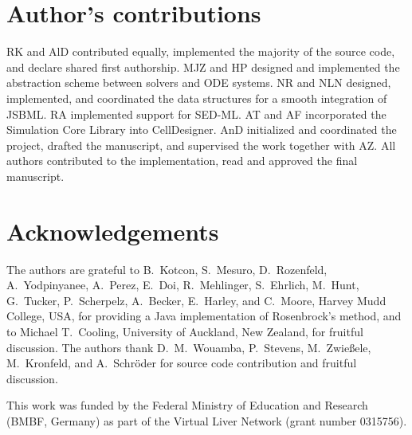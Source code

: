 \documentclass[10pt]{bmc_article}
\newenvironment{bmcformat}{\fussy\setboolean{publ}{true}}{\fussy}
\begin{document}
\begin{bmcformat}
\section*{Author's contributions}
RK and AlD contributed equally, implemented the majority of the source code, and declare shared first authorship.
MJZ and HP designed and implemented the abstraction scheme between solvers and ODE systems.
NR and NLN designed, implemented, and coordinated the data structures for a smooth integration of JSBML.
RA implemented support for \acs{SED-ML}. AT and AF incorporated the Simulation Core Library into CellDesigner.
AnD initialized and coordinated the project, drafted the manuscript, and supervised the work together with AZ.
All authors contributed to the implementation, read and approved the final manuscript.    

\section*{Acknowledgements}
The authors are grateful to B.~Kotcon, S.~Mesuro, D.~Rozenfeld, A.~Yodpinyanee,
A.~Perez, E.~Doi, R.~Mehlinger, S.~Ehrlich, M.~Hunt, G.~Tucker, P.~Scherpelz,
A.~Becker, E.~Harley, and C.~Moore, Harvey Mudd College, USA, for providing a
Java implementation of Rosenbrock's method, and to Michael T.~Cooling,
University of Auckland, New Zealand, for fruitful discussion. The authors thank
D.~M.~Wouamba, P.~Stevens, M.~Zwie\ss{}ele, M.~Kronfeld, and A.~Schr\"oder for
source code contribution and fruitful discussion.

This work was funded by the Federal Ministry of Education and Research (BMBF,
Germany) as part of the Virtual Liver Network (grant number 0315756).
 


\end{bmcformat}
\end{document}
